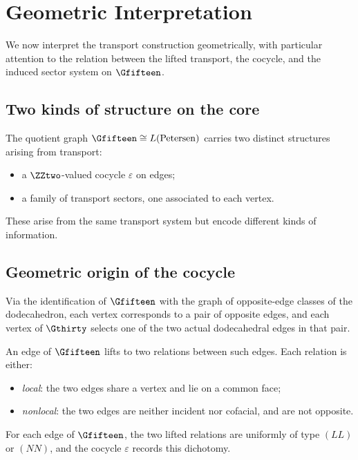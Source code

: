 \section{Geometric Interpretation}

We now interpret the transport construction geometrically, with
particular attention to the relation between the lifted transport, the
cocycle, and the induced sector system on $\Gfifteen$.

\subsection{Two kinds of structure on the core}

The quotient graph $\Gfifteen \cong L(\mathrm{Petersen})$ carries two
distinct structures arising from transport:

\begin{itemize}
\item a $\ZZtwo$-valued cocycle $\varepsilon$ on edges;
\item a family of transport sectors, one associated to each vertex.
\end{itemize}

These arise from the same transport system but encode different kinds of
information.

\subsection{Geometric origin of the cocycle}

Via the identification of $\Gfifteen$ with the graph of opposite-edge
classes of the dodecahedron, each vertex corresponds to a pair of
opposite edges, and each vertex of $\Gthirty$ selects one of the two
actual dodecahedral edges in that pair.

An edge of $\Gfifteen$ lifts to two relations between such edges. Each
relation is either:

\begin{itemize}
\item \emph{local}: the two edges share a vertex and lie on a common face;
\item \emph{nonlocal}: the two edges are neither incident nor cofacial,
and are not opposite.
\end{itemize}

For each edge of $\Gfifteen$, the two lifted relations are uniformly of
type $(LL)$ or $(NN)$, and the cocycle $\varepsilon$ records this
dichotomy.

